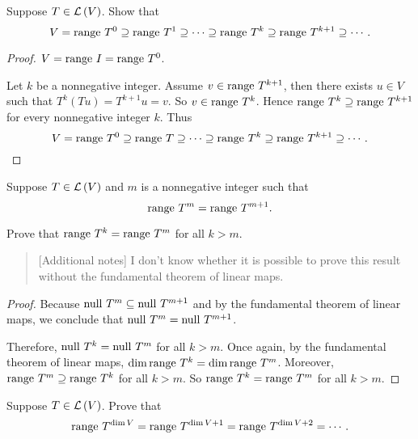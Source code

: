 \begin{exercise}\label{chapter8:sectionA:exercise6}
    Suppose $T\in\mathcal{L}\left({V}\right)$. Show that
    \[
        V = \operatorname{range}\,{T^{0}} \supseteq \operatorname{range}\,{T^{1}} \supseteq \cdots \supseteq \operatorname{range}\,{T^{k}} \supseteq \operatorname{range}\,{T^{k+1}} \supseteq \cdots.
    \]
\end{exercise}

\begin{proof}
    $V = \operatorname{range}\,{I} = \operatorname{range}\,{T^{0}}$.

    Let $k$ be a nonnegative integer. Assume $v\in \operatorname{range}\,{T^{k+1}}$, then there exists $u\in V$ such that $T^{k}(Tu) = T^{k+1}u = v$. So $v\in \operatorname{range}\,{T^{k}}$. Hence $\operatorname{range}\,{T^{k}}\supseteq \operatorname{range}\,{T^{k+1}}$ for every nonnegative integer $k$. Thus
    \[
        V = \operatorname{range}\,{T^{0}}\supseteq \operatorname{range}\,{T}\supseteq \cdots \supseteq \operatorname{range}\,{T^{k}}\supseteq \operatorname{range}\,{T^{k+1}}\supseteq \cdots.\qedhere
    \]
\end{proof}
\newpage

\begin{exercise}\label{chapter8:sectionA:exercise7}
    Suppose $T\in\mathcal{L}\left({V}\right)$ and $m$ is a nonnegative integer such that
    \[
        \operatorname{range}\,{T^{m}} = \operatorname{range}\,{T^{m+1}}.
    \]

    Prove that $\operatorname{range}\,{T^{k}} = \operatorname{range}\,{T^{m}}$ for all $k > m$.
\end{exercise}

\begin{quote}[Additional notes]
    I don't know whether it is possible to prove this result without the fundamental theorem of linear maps.
\end{quote}

\begin{proof}
    Because $\operatorname{null}\,{T^{m}}\subseteq \operatorname{null}\,{T^{m+1}}$ and by the fundamental theorem of linear maps, we conclude that $\operatorname{null}\,{T^{m}} = \operatorname{null}\,{T^{m+1}}$.

    Therefore, $\operatorname{null}\,{T^{k}} = \operatorname{null}\,{T^{m}}$ for all $k > m$. Once again, by the fundamental theorem of linear maps, $\dim\operatorname{range}\,{T^{k}} = \dim\operatorname{range}\,{T^{m}}$. Moreover, $\operatorname{range}\,{T^{m}}\supseteq \operatorname{range}\,{T^{k}}$ for all $k > m$. So $\operatorname{range}\,{T^{k}} = \operatorname{range}\,{T^{m}}$ for all $k > m$.
\end{proof}
\newpage

\begin{exercise}\label{chapter8:sectionA:exercise8}
    Suppose $T\in\mathcal{L}\left({V}\right)$. Prove that
    \[
        \operatorname{range}\,{T^{\dim V}} = \operatorname{range}\,{T^{\dim V + 1}} = \operatorname{range}\,{T^{\dim V + 2}} = \cdots.
    \]
\end{exercise}

